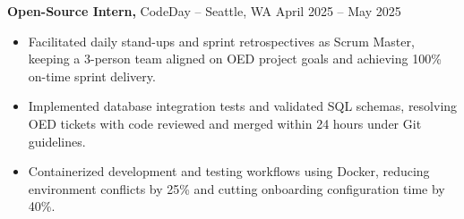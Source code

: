 \documentclass[11pt]{article}       %
\begin{document}

\textbf{Open-Source Intern,} {CodeDay} -- Seattle, WA \hfill April 2025 -- May 2025 \\
\vspace{-9pt}
\begin{itemize}
  \item Facilitated daily stand-ups and sprint retrospectives as Scrum Master, keeping a 3-person team aligned on OED project goals and achieving 100\% on-time sprint delivery.
  \item Implemented database integration tests and validated SQL schemas, resolving OED tickets with code reviewed and merged within 24 hours under Git guidelines.
  \item Containerized development and testing workflows using Docker, reducing environment conflicts by 25\% and cutting onboarding configuration time by 40\%.
\end{itemize}

\end{document}
